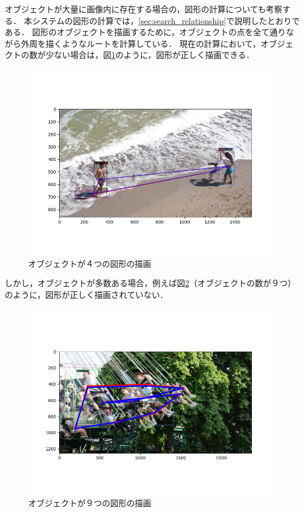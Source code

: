\documentclass[a4j,12pt,dvipdfmx]{jreport}
\begin{document}
オブジェクトが大量に画像内に存在する場合の，図形の計算についても考察する．
本システムの図形の計算では，\ref{sec:search_relationship}で説明したとおりである．
図形のオブジェクトを描画するために，オブジェクトの点を全て通りながら外周を描くようなルートを計算している．
現在の計算において，オブジェクトの数が少ない場合は，図\ref{fig:img_2_4_4}のように，図形が正しく描画できる．
\begin{figure}[H]
  \centering
  \includegraphics[width=13cm]{image/result_2_4_4.png}
  \caption{オブジェクトが４つの図形の描画}
  \label{fig:img_2_4_4}
\end{figure}

しかし，オブジェクトが多数ある場合，例えば図\ref{fig:img_2_4_5}（オブジェクトの数が９つ）のように，図形が正しく描画されていない．
\begin{figure}[H]
  \centering
  \includegraphics[width=13cm]{image/result_2_4_5.png}
  \caption{オブジェクトが９つの図形の描画}
  \label{fig:img_2_4_5}
\end{figure}
\end{document}
